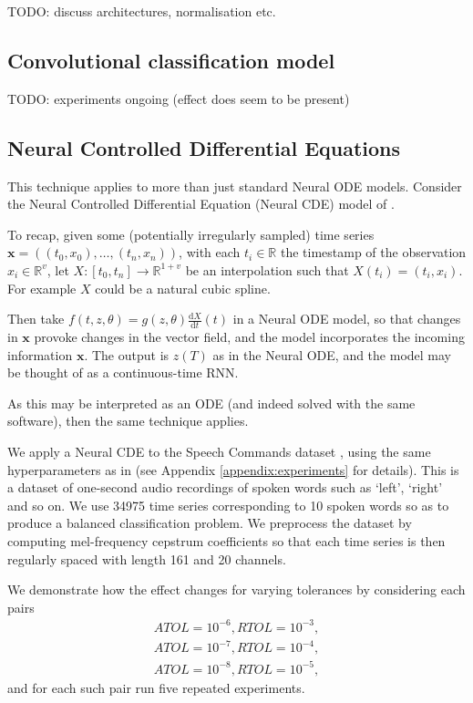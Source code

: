 \documentclass{article}
\theoremstyle{plain}
\theoremstyle{definition}
\newcommand{\reals}{\mathbb{R}}
\newcommand{\dd}{\mathrm{d}}
\begin{document}
TODO: discuss architectures, normalisation etc.

\subsection{Convolutional classification model}
TODO: experiments ongoing (effect does seem to be present)

\subsection{Neural Controlled Differential Equations}
This technique applies to more than just standard Neural ODE models. Consider the Neural Controlled Differential Equation (Neural CDE) model of \citet{kidger2020neuralcde}.

To recap, given some (potentially irregularly sampled) time series $\mathbf{x} = ((t_0, x_0), \ldots, (t_n, x_n))$, with each $t_i \in \reals$ the timestamp of the observation $x_i \in \reals^v$, let $X \colon [t_0, t_n] \to \reals^{1 + v}$ be an interpolation such that $X(t_i) = (t_i, x_i)$. For example $X$ could be a natural cubic spline.

Then take $f(t, z, \theta) = g(z, \theta) \frac{\dd X}{\dd t} (t)$ in a Neural ODE model, so that changes in $\mathbf{x}$ provoke changes in the vector field, and the model incorporates the incoming information $\mathbf{x}$. The output is $z(T)$ as in the Neural ODE, and the model may be thought of as a continuous-time RNN.

As this may be interpreted as an ODE (and indeed solved with the same software), then the same technique applies.

We apply a Neural CDE to the Speech Commands dataset \citep{TODO}, using the same hyperparameters as in \citet{kidger2020neuralcde} (see Appendix \ref{appendix:experiments} for details). This is a dataset of one-second audio recordings of spoken words such as `left', `right' and so on. We use 34975 time series corresponding to 10 spoken words so as to produce a balanced classification problem. We preprocess the dataset by computing mel-frequency cepstrum coefficients so that each time series is then regularly spaced with length 161 and 20 channels.

We demonstrate how the effect changes for varying tolerances by considering each pairs
\begin{align*}
ATOL = 10^{-6}, RTOL = 10^{-3},\\
ATOL = 10^{-7}, RTOL=10^{-4},\\
ATOL = 10^{-8}, RTOL=10^{-5},
\end{align*}
and for each such pair run five repeated experiments. 
\end{document}
